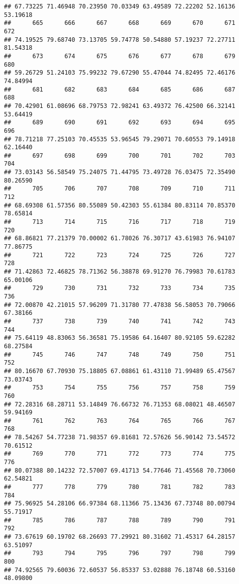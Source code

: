 \documentclass[
]{article}
\begin{document}
\begin{verbatim}
## 67.73225 71.46948 70.23950 70.03349 63.49589 72.22202 52.16136 53.19618 
##      665      666      667      668      669      670      671      672 
## 74.19525 79.68740 73.13705 59.74778 50.54880 57.19237 72.27711 81.54318 
##      673      674      675      676      677      678      679      680 
## 59.26729 51.24103 75.99232 79.67290 55.47044 74.82495 72.46176 74.84994 
##      681      682      683      684      685      686      687      688 
## 70.42901 61.08696 68.79753 72.98241 63.49372 76.42500 66.32141 53.64419 
##      689      690      691      692      693      694      695      696 
## 78.71218 77.25103 70.45535 53.96545 79.29071 70.60553 79.14918 62.16440 
##      697      698      699      700      701      702      703      704 
## 73.03143 56.58549 75.24075 71.44795 73.49728 76.03475 72.35490 80.26590 
##      705      706      707      708      709      710      711      712 
## 68.69308 61.57356 80.55089 50.42303 55.61384 80.83114 70.85370 78.65814 
##      713      714      715      716      717      718      719      720 
## 68.86821 77.21379 70.00002 61.78026 76.30717 43.61983 76.94107 77.86775 
##      721      722      723      724      725      726      727      728 
## 71.42863 72.46825 78.71362 56.38878 69.91270 76.79983 70.61783 65.00106 
##      729      730      731      732      733      734      735      736 
## 72.00870 42.21015 57.96209 71.31780 77.47838 56.58053 70.79066 67.38166 
##      737      738      739      740      741      742      743      744 
## 75.64119 48.83063 56.36581 75.19586 64.16407 80.92105 59.62282 68.27584 
##      745      746      747      748      749      750      751      752 
## 80.16670 67.70930 75.18805 67.08861 61.43110 71.99489 65.47567 73.03743 
##      753      754      755      756      757      758      759      760 
## 72.28316 68.28711 53.14849 76.66732 76.71353 68.08021 48.46507 59.94169 
##      761      762      763      764      765      766      767      768 
## 78.54267 54.77238 71.98357 69.81681 72.57626 56.90142 73.54572 70.61512 
##      769      770      771      772      773      774      775      776 
## 80.07388 80.14232 72.57007 69.41713 54.77646 71.45568 70.73060 62.54821 
##      777      778      779      780      781      782      783      784 
## 75.96925 54.28106 66.97384 68.11366 75.13436 67.73748 80.00794 55.71917 
##      785      786      787      788      789      790      791      792 
## 73.67619 60.19702 68.26693 77.29921 80.31602 71.45317 64.28157 63.51097 
##      793      794      795      796      797      798      799      800 
## 74.92565 79.60036 72.60537 56.85337 53.02888 76.18748 60.53160 48.09800 

\end{verbatim}
\end{document}

